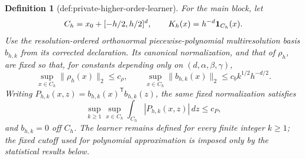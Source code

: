 \documentclass{article}
\newtheorem{definition}{Definition}
\begin{document}
\begin{definition}[def:private-higher-order-learner]
For the main block, let
\[
 C_h=x_0+[-h/2,h/2]^d,
 \qquad K_h(x)=h^{-d}{\bf1}_{C_h}(x).
\]
Use the resolution-ordered orthonormal piecewise-polynomial multiresolution basis \(b_{h,k}\) from its corrected declaration.  Its canonical normalization, and that of \(\rho_h\), are fixed so that, for constants depending only on \((d,\alpha,\beta,\gamma)\),
\[
 \sup_{x\in C_h}\lVert\rho_h(x)\rVert_2\le c_\rho,
 \qquad
 \sup_{x\in C_h}\lVert b_{h,k}(x)\rVert_2\le c_b k^{1/2}h^{-d/2}.
\]
Writing \(P_{h,k}(x,z)=b_{h,k}(x)^{\mathsf T}b_{h,k}(z)\), the same fixed normalization satisfies
\[
 \sup_{k\ge1}\sup_{x\in C_h}\int_{C_h}|P_{h,k}(x,z)|\,dz\le c_P,
\]
and \(b_{h,k}=0\) off \(C_h\).  The learner remains defined for every finite integer \(k\ge1\); the fixed cutoff used for polynomial approximation is imposed only by the statistical results below.


\end{definition}
\end{document}
